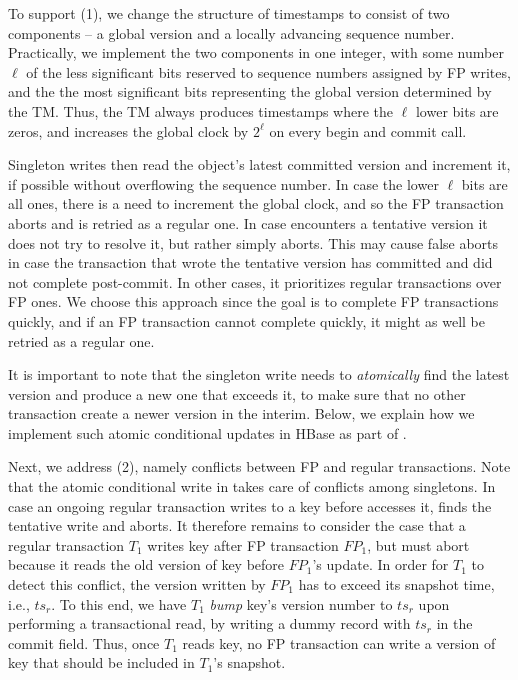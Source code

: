 To support (1), we change the structure of timestamps to consist of two 
components -- a global version and a locally advancing sequence number.
Practically, we implement the two components in one  integer, with some number $\ell$ of the less significant bits
reserved to sequence numbers assigned by FP writes, and the the most significant bits representing 
the global version determined by the TM. Thus, the TM always produces timestamps where the $\ell$ lower bits are zeros,
and increases the global clock by $2^\ell$ on every begin and commit call.  

Singleton writes then read the object's latest committed version and increment it, if possible without overflowing the sequence number. 
In case the lower $\ell$ bits are all ones, there is a need to increment the global clock, and so the FP transaction aborts and is retried
as a regular one. 
In case   encounters a tentative version it does not try to resolve it, but rather simply aborts.
This may cause false aborts in case the transaction that wrote the tentative version has committed and did not 
complete post-commit. In other cases, it prioritizes regular transactions over FP ones. We choose this approach since
the goal is to complete FP transactions quickly, and if an FP transaction cannot complete quickly, it might as well be 
retried as a regular one.

It is important to note that the singleton write needs to \emph{atomically} find the latest version and produce a new one that exceeds it, 
to make sure that no other transaction create a newer version in the interim.
Below, we explain how we implement such atomic conditional updates in HBase as part of \sys. 

Next, we address (2), namely conflicts between FP and regular transactions.
Note that the atomic conditional write in  takes care of conflicts among singletons.
In case an ongoing regular transaction writes to a key before  accesses it, 
 finds the tentative write and aborts. It therefore remains to consider the case that
a regular transaction $T_1$ writes key after FP transaction $FP_1$, but must abort because 
it reads the old version of key before $FP_1$'s update. In order for $T_1$ to detect this 
conflict, the version written by $FP_1$ has to exceed its snapshot time, i.e., $ts_r$.
To this end, we have $T_1$ \emph{bump} key's version number to $ts_r$ upon 
performing a transactional read, by writing a dummy record with $ts_r$ in the commit field. 
Thus, once $T_1$ reads key, no FP transaction can write a version of key that should be 
included in $T_1$'s snapshot.



